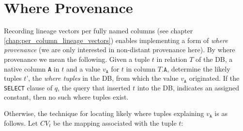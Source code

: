 \section{Where Provenance}
Recording lineage vectors per fully named columns (see chapter \ref{chap:per_column_lineage_vectors}) enables implementing a form of \textit{where provenance} (we are only interested in non-distant provenance here). By where provenance we mean the following. Given a tuple $t$ in relation $T$ of the DB, a native column \texttt{A} in $t$ and a value $v_\texttt{A}$ for $t$ in column $T.\texttt{A}$, determine the likely tuples $t’$, the \textit{where tuples} in the DB, from which the value $v_\texttt{A}$ originated. If the \texttt{SELECT} clause of $q$, the query that inserted $t$ into the DB, indicates an assigned constant, then no such where tuples exist. 
\par Otherwise, the technique for locating likely where tuples explaining $v_\texttt{A}$ is as follows. Let $CV_t$ be the mapping associated with the tuple $t$:
